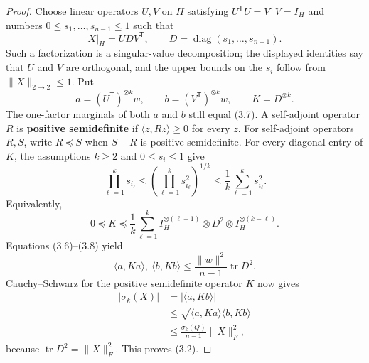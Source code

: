 \documentclass[10pt,a4paper]{amsart}
\begin{document}
\begin{proof}
Choose linear operators $U,V$ on $H$ satisfying
$U^{\mathsf T}U=V^{\mathsf T}V=I_H$ and numbers
$0\le s_1,\ldots,s_{n-1}\le1$ such that
\[
X|_H=UDV^{\mathsf T},
\qquad
D=\operatorname{diag}(s_1,\ldots,s_{n-1}).
\]
Such a factorization is a singular-value decomposition; the displayed
identities say that $U$ and $V$ are orthogonal, and the upper bounds on the
$s_i$ follow from $\|X\|_{2\to2}\le1$. Put
\[
a=(U^{\mathsf T})^{\otimes k}w,
\qquad
b=(V^{\mathsf T})^{\otimes k}w,
\qquad
K=D^{\otimes k}.
\]
The one-factor marginals of both $a$ and $b$ still equal (3.7). A self-adjoint
operator $R$ is \textbf{positive semidefinite} if
$\langle z,Rz\rangle\ge0$ for every $z$. For self-adjoint operators $R,S$,
write $R\preceq S$ when $S-R$ is positive semidefinite. For every diagonal
entry of $K$, the assumptions $k\ge2$ and $0\le s_i\le1$ give
\[
\prod_{\ell=1}^k s_{i_\ell}
\le\left(\prod_{\ell=1}^k s_{i_\ell}^2\right)^{1/k}
\le\frac1k\sum_{\ell=1}^k s_{i_\ell}^2.
\]
Equivalently,
\[
0\preceq K\preceq\frac1k\sum_{\ell=1}^k
I_H^{\otimes(\ell-1)}\otimes D^2\otimes
I_H^{\otimes(k-\ell)}.
\tag{3.8}
\]
Equations (3.6)--(3.8) yield
\[
\langle a,Ka\rangle,\ \langle b,Kb\rangle
\le\frac{\|w\|^2}{n-1}\operatorname{tr}D^2.
\]
Cauchy--Schwarz for the positive semidefinite operator $K$ now gives
\[
\begin{aligned}
|\sigma_k(X)|
&=|\langle a,Kb\rangle|\\
&\le\sqrt{\langle a,Ka\rangle\langle b,Kb\rangle}\\
&\le\frac{\sigma_k(Q)}{n-1}\|X\|_F^2,
\end{aligned}
\]
because $\operatorname{tr}D^2=\|X\|_F^2$. This proves (3.2).
\end{proof}
\end{document}

